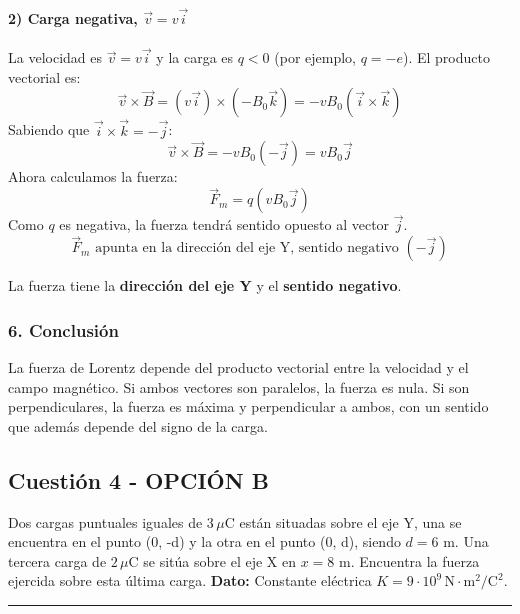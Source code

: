 \paragraph{2) Carga negativa, $\vec{v} = v\vec{i}$}
La velocidad es $\vec{v} = v\vec{i}$ y la carga es $q<0$ (por ejemplo, $q=-e$).
El producto vectorial es:
$$ \vec{v} \times \vec{B} = (v\vec{i}) \times (-B_0\vec{k}) = -vB_0(\vec{i} \times \vec{k}) $$
Sabiendo que $\vec{i} \times \vec{k} = -\vec{j}$:
$$ \vec{v} \times \vec{B} = -vB_0(-\vec{j}) = vB_0\vec{j} $$
Ahora calculamos la fuerza:
$$ \vec{F}_m = q (vB_0\vec{j}) $$
Como $q$ es negativa, la fuerza tendrá sentido opuesto al vector $\vec{j}$.
$$ \vec{F}_m \text{ apunta en la dirección del eje Y, sentido negativo } (-\vec{j}) $$
\begin{cajaresultado}
La fuerza tiene la \textbf{dirección del eje Y} y el \textbf{sentido negativo}.
\end{cajaresultado}

\subsubsection*{6. Conclusión}
\begin{cajaconclusion}
La fuerza de Lorentz depende del producto vectorial entre la velocidad y el campo magnético. Si ambos vectores son paralelos, la fuerza es nula. Si son perpendiculares, la fuerza es máxima y perpendicular a ambos, con un sentido que además depende del signo de la carga.
\end{cajaconclusion}

\newpage

\subsection{Cuestión 4 - OPCIÓN B}
\label{subsec:4B_2009_jun_ord}

\begin{cajaenunciado}
Dos cargas puntuales iguales de $3\,\mu\text{C}$ están situadas sobre el eje Y, una se encuentra en el punto (0, -d) y la otra en el punto (0, d), siendo $d=6$ m. Una tercera carga de $2\,\mu\text{C}$ se sitúa sobre el eje X en $x=8$ m. Encuentra la fuerza ejercida sobre esta última carga.
\textbf{Dato:} Constante eléctrica $K=9\cdot10^9\,\text{N}\cdot\text{m}^2/\text{C}^2$.
\end{cajaenunciado}
\hrule


